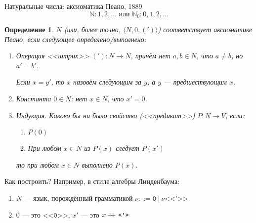\documentclass[handout]{beamer}
\newtheorem{dfn}{Определение}[section]
\newcommand\doubleplus{+\kern-1.3ex+\kern0.8ex}
\begin{document}
\begin{frame}{Натуральные числа: аксиоматика Пеано, 1889}\vspace{-0.5cm}
 $$\mathbb{N}: 1, 2, \dots \mbox{ или } \mathbb{N}_0: 0, 1, 2, \dots$$\vspace{-1cm}\pause
\begin{dfn}
  $N$ (или, более точно, $\langle N, 0, (')\rangle$) \emph{соответствует} аксиоматике Пеано, 
  если следующее определено/выполнено:\pause
  \begin{enumerate}
     \item Операция <<штрих>> $('): N \to N$, причём нет $a,b \in N$, что $a \ne b$, но $a' = b'$.\pause
           
           Если $x = y'$, то $x$ назовём следующим за $y$, а $y$ --- предшествующим $x$.\pause
     \item Константа $0 \in N$: нет $x \in N$, что $x' = 0$.\pause
     \item Индукция. Каково бы ни было свойство (<<предикат>>) $P: N \to V$, если:
           \begin{enumerate}
           \item $P(0)$
           \item При любом $x\in N$ из $P(x)$ следует $P(x')$
           \end{enumerate}
           то при любом $x \in N$ выполнено $P(x)$.
  \end{enumerate}
\end{dfn}\pause
Как построить? Например, в стиле алгебры Линденбаума:\pause
\begin{enumerate}
\item $N$ --- язык, порождённый грамматикой $\nu ::= \texttt{0}\ |\ \nu \texttt{<<'>>}$\pause
\item $0$ --- это $\texttt{<<0>>}$, $x'$ --- это $x \doubleplus \texttt{<<'>>}$
\end{enumerate}
\end{frame}
\end{document}
